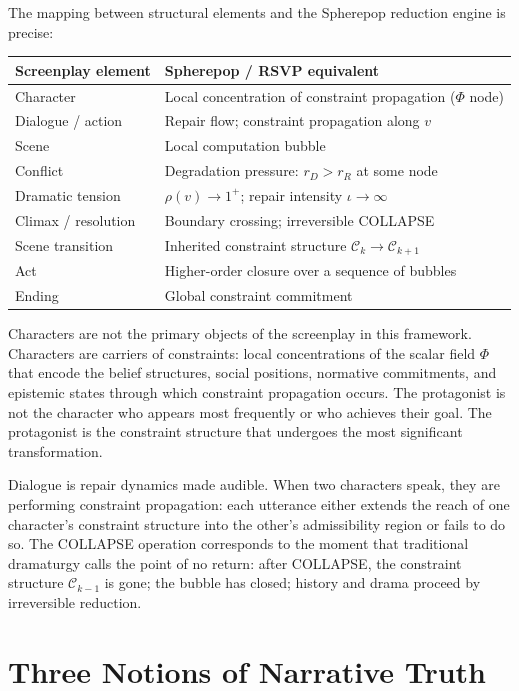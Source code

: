 \documentclass[11pt, a4paper]{article}
\theoremstyle{definition}
\theoremstyle{remark}
\begin{document}
The mapping between structural elements and the Spherepop reduction engine
is precise:

\bigskip
\noindent
\begin{tabular}{@{}p{}p{}@{}}
\toprule
\textbf{Screenplay element} & \textbf{Spherepop / RSVP equivalent} \\
\midrule
Character & Local concentration of constraint propagation ($\Phi$ node) \\
Dialogue / action & Repair flow; constraint propagation along $v$ \\
Scene & Local computation bubble \\
Conflict & Degradation pressure: $r_D > r_R$ at some node \\
Dramatic tension & $\rho(v) \to 1^+$; repair intensity $\iota \to \infty$ \\
Climax / resolution & Boundary crossing; irreversible COLLAPSE \\
Scene transition & Inherited constraint structure $\mathcal{C}_k \to \mathcal{C}_{k+1}$ \\
Act & Higher-order closure over a sequence of bubbles \\
Ending & Global constraint commitment \\
\bottomrule
\end{tabular}
\bigskip

Characters are not the primary objects of the screenplay in this framework.
Characters are carriers of constraints: local concentrations of the scalar
field $\Phi$ that encode the belief structures, social positions, normative
commitments, and epistemic states through which constraint propagation occurs.
The protagonist is not the character who appears most frequently or who
achieves their goal. The protagonist is the constraint structure that undergoes
the most significant transformation.

Dialogue is repair dynamics made audible. When two characters speak, they are
performing constraint propagation: each utterance either extends the reach of
one character's constraint structure into the other's admissibility region or
fails to do so. The COLLAPSE operation corresponds to the moment that
traditional dramaturgy calls the point of no return: after COLLAPSE, the
constraint structure $\mathcal{C}_{k-1}$ is gone; the bubble has closed;
history and drama proceed by irreversible reduction.

\section{Three Notions of Narrative Truth}
\end{document}
